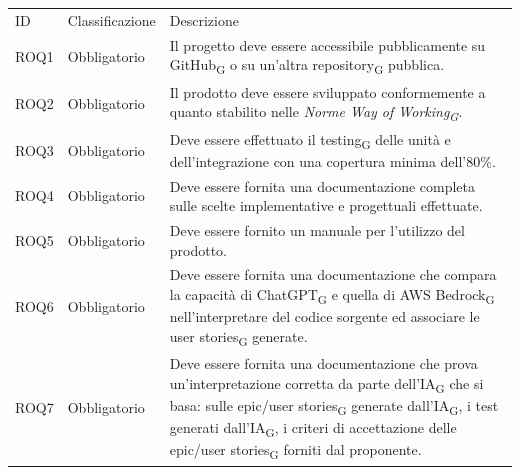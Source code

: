 \documentclass{article}
\begin{document}
\begin{center}
    \begin{tabular}{|p{3cm}|p{3cm}|p{6cm}|}
    \rowcolor{Blue} 
\hline
ID & Classificazione & Descrizione\\ 
\rowcolor{LightBlue}
\hline
ROQ1& Obbligatorio & Il progetto deve essere accessibile pubblicamente su GitHub\textsubscript{G} o su un'altra repository\textsubscript{G} pubblica.\\ 
\rowcolor{LighterBlue}
\hline
ROQ2& Obbligatorio & Il prodotto deve essere sviluppato conformemente a quanto stabilito nelle \textit{Norme Way of Working\textsubscript{G}}. \\ 
\rowcolor{LightBlue}
\hline
ROQ3& Obbligatorio & Deve essere effettuato il testing\textsubscript{G} delle unità e dell'integrazione con una copertura minima dell'80\%.\\
\hline
\rowcolor{LighterBlue}

ROQ4& Obbligatorio & Deve essere fornita una documentazione completa sulle scelte implementative e progettuali effettuate.\\
\hline
\rowcolor{LightBlue}
ROQ5& Obbligatorio & Deve essere fornito un manuale per l'utilizzo del prodotto.\\
\hline
\rowcolor{LighterBlue}
ROQ6& Obbligatorio & Deve essere fornita una documentazione che compara la capacità di ChatGPT\textsubscript{G} e quella di AWS Bedrock\textsubscript{G} nell'interpretare del codice sorgente ed associare le user stories\textsubscript{G} generate.\\
\hline
\rowcolor{LightBlue}
ROQ7& Obbligatorio & Deve essere fornita una documentazione che prova un'interpretazione corretta da parte dell'IA\textsubscript{G} che si basa: sulle epic/user stories\textsubscript{G} generate dall'IA\textsubscript{G}, i test generati dall'IA\textsubscript{G}, i criteri di accettazione delle epic/user stories\textsubscript{G} forniti dal proponente.\\
\hline
\end{tabular}
\label{tab:reqal}
\end{center}
\newpage
\end{document}
